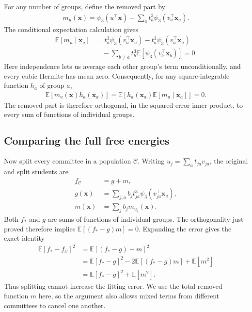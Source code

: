 \documentclass[11pt, reqno]{amsart}
\theoremstyle{notestyle}
\theoremstyle{defstyle}
\begin{document}
For any number of groups, define the removed part by
\begin{align*}
    m_u(\mathbf x)
    =\psi_3(u^\top\mathbf x)
      -\sum_a t_a^3\psi_3(v_a^\top\mathbf x_a).
\end{align*}
The conditional expectation calculation gives
\begin{align*}
    \mathbb E[m_u\mid\mathbf x_a]
    &=t_a^3\psi_3(v_a^\top\mathbf x_a)
      -t_a^3\psi_3(v_a^\top\mathbf x_a) \\
    &\quad-\sum_{b\ne a}t_b^3\mathbb E[\psi_3(v_b^\top\mathbf x_b)]
      =0.
\end{align*}
Here independence lets us average each other group's term unconditionally, and every cubic Hermite has mean zero.
Consequently, for any square-integrable function $h_a$ of group $a$,
\begin{align*}
    \mathbb E[m_u(\mathbf x)h_a(\mathbf x_a)]
    =\mathbb E\!\left[h_a(\mathbf x_a)\mathbb E[m_u\mid\mathbf x_a]\right]
    =0.
\end{align*}
The removed part is therefore orthogonal, in the squared-error inner product, to every sum of functions of individual groups.

\subsection{Comparing the full free energies}

Now split every committee in a population $\mathcal C$.
Writing $u_j=\sum_a t_{ja}v_{ja}$, the original and split students are
\begin{align*}
    f_{\mathcal C}&=g+m, \\
    g(\mathbf x)&=\sum_{j,a}b_jt_{ja}^3\psi_3(v_{ja}^\top\mathbf x_a), \\
    m(\mathbf x)&=\sum_j b_jm_{u_j}(\mathbf x).
\end{align*}
Both $f_*$ and $g$ are sums of functions of individual groups.
The orthogonality just proved therefore implies $\mathbb E[(f_*-g)m]=0$.
Expanding the error gives the exact identity
\begin{align*}
    \mathbb E[f_*-f_{\mathcal C}]^2
    &=\mathbb E[(f_*-g)-m]^2 \\
    &=\mathbb E[f_*-g]^2-2\mathbb E[(f_*-g)m]+\mathbb E[m^2] \\
    &=\mathbb E[f_*-g]^2+\mathbb E[m^2].
\end{align*}
Thus splitting cannot increase the fitting error.
We use the total removed function $m$ here, so the argument also allows mixed terms from different committees to cancel one another.
\end{document}
